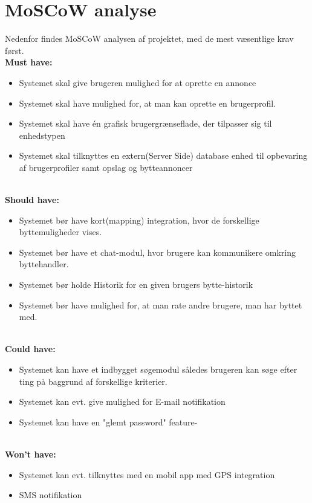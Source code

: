 \section{MoSCoW analyse}
Nedenfor findes MoSCoW analysen af projektet, med de mest væsentlige krav først.\\
\textbf{Must have:}
\begin{itemize}[noitemsep]
	\item Systemet skal give brugeren mulighed for at oprette en annonce
	\item Systemet skal have mulighed for, at man kan oprette en brugerprofil.
	\item Systemet skal have én grafisk brugergrænseflade, der tilpasser sig til enhedstypen
	\item Systemet skal tilknyttes en extern(Server Side) database enhed til opbevaring af brugerprofiler samt opslag og bytteannoncer 
	
\end{itemize}

\textbf{\\Should have:}
\begin{itemize}[noitemsep]
	\item Systemet bør have kort(mapping) integration, hvor de forskellige byttemuligheder vises.
	\item Systemet bør have et chat-modul, hvor brugere kan kommunikere omkring byttehandler.
	\item Systemet bør holde Historik for en given brugers bytte-historik
	\item Systemet bør have mulighed for, at man rate andre brugere, man har byttet med.
	
\end{itemize}

\textbf{\\Could have:}
\begin{itemize}[noitemsep]
	\item Systemet kan have et indbygget søgemodul således brugeren kan søge efter ting på baggrund af forskellige kriterier.
	\item Systemet kan evt. give mulighed for E-mail notifikation
	\item Systemet kan have en "glemt password" feature-
\end{itemize}

\textbf{\\Won't have:}
\begin{itemize}[noitemsep]
	\item Systemet kan evt. tilknyttes med en mobil app med GPS integration
	\item SMS notifikation 
	
\end{itemize}
